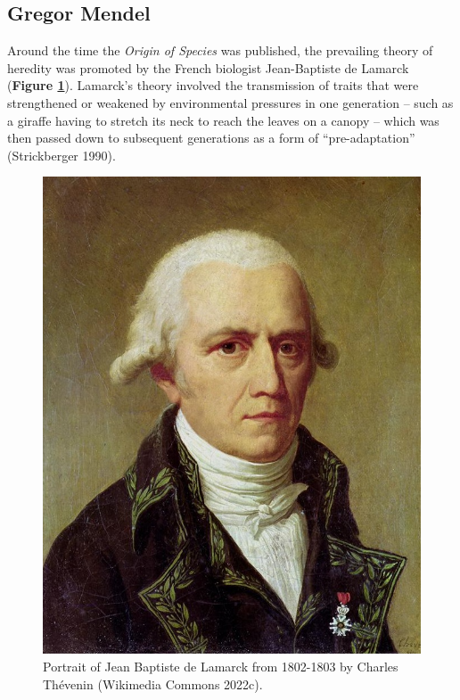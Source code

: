 \documentclass[
]{book}
\begin{document}
\hypertarget{gregor-mendel}{%
\subsection{Gregor Mendel}\label{gregor-mendel}}

Around the time the \emph{Origin of Species} was published, the prevailing theory of heredity was promoted by the French biologist Jean-Baptiste de Lamarck (\textbf{Figure \ref{fig:lamarck}}). Lamarck's theory involved the transmission of traits that were strengthened or weakened by environmental pressures in one generation -- such as a giraffe having to stretch its neck to reach the leaves on a canopy -- which was then passed down to subsequent generations as a form of ``pre-adaptation'' (Strickberger 1990).



\begin{figure}

{\centering \includegraphics[width=0.5\linewidth]{figs/introduction/Jean-Baptiste_de_Lamarck} 

}

\caption{Portrait of Jean Baptiste de Lamarck from 1802-1803 by Charles Thévenin (Wikimedia Commons 2022c).}\label{fig:lamarck}
\end{figure}
\end{document}
